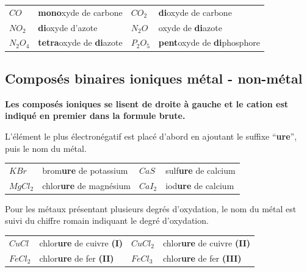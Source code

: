 \documentclass[
  11pt,
  a4paper,
  openany]{book}
\begin{document}
\begin{longtable}[]{@{}
  >{\centering\arraybackslash}p{}
  >{\raggedright\arraybackslash}p{}
  >{\centering\arraybackslash}p{}
  >{\raggedright\arraybackslash}p{}@{}}
\toprule\noalign{}
\endhead
\bottomrule\noalign{}
\endlastfoot
\(CO\) & \textbf{mono}xyde de carbone & \(CO_2\) & \textbf{di}oxyde de carbone \\
\(NO_2\) & \textbf{di}oxyde d'azote & \(N_2O\) & oxyde de \textbf{di}azote \\
\(N_2O_4\) & \textbf{tetra}oxyde de \textbf{di}azote & \(P_2O_5\) & \textbf{pent}oxyde de \textbf{di}phosphore \\
\end{longtable}

\subsection{Composés binaires ioniques \textbar{} métal - non-métal}\label{composuxe9s-binaires-ioniques-muxe9tal---non-muxe9tal}

\textbf{Les composés ioniques se lisent de droite à gauche et le cation est indiqué en premier dans la formule brute.}

L'élément le plus électronégatif est placé d'abord en ajoutant le suffixe ``\textbf{ure}'', puis le nom du métal.

\begin{longtable}[]{@{}
  >{\centering\arraybackslash}p{}
  >{\raggedright\arraybackslash}p{}
  >{\centering\arraybackslash}p{}
  >{\raggedright\arraybackslash}p{}@{}}
\toprule\noalign{}
\endhead
\bottomrule\noalign{}
\endlastfoot
\(KBr\) & brom\textbf{ure} de potassium & \(CaS\) & sulf\textbf{ure} de calcium \\
\(MgCl_2\) & chlor\textbf{ure} de magnésium & \(CaI_2\) & iod\textbf{ure} de calcium \\
\end{longtable}

Pour les métaux présentant plusieurs degrés d'oxydation, le nom du métal est suivi du chiffre romain indiquant le degré d'oxydation.

\begin{longtable}[]{@{}
  >{\centering\arraybackslash}p{}
  >{\raggedright\arraybackslash}p{}
  >{\centering\arraybackslash}p{}
  >{\raggedright\arraybackslash}p{}@{}}
\toprule\noalign{}
\endhead
\bottomrule\noalign{}
\endlastfoot
\(CuCl\) & chlor\textbf{ure} de cuivre \textbf{(I)} & \(CuCl_2\) & chlor\textbf{ure} de cuivre \textbf{(II)} \\
\(FeCl_2\) & chlor\textbf{ure} de fer \textbf{(II)} & \(FeCl_3\) & chlor\textbf{ure} de fer \textbf{(III)} \\
\end{longtable}
\end{document}
